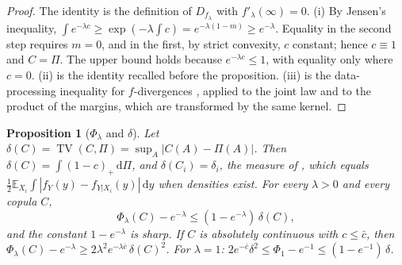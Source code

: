 \documentclass[11pt,a4paper]{article}
\newtheorem{proposition}[theorem]{Proposition}
\theoremstyle{definition}
\theoremstyle{remark}
\newcommand{\E}{\mathbb{E}}
\newcommand{\TV}{\operatorname{TV}}
\begin{document}
\begin{proof}
The identity is the definition of $D_{f_\lambda}$ with $f'_\lambda(\infty)=0$. (i) By Jensen's inequality, $\int e^{-\lambda c}\ge\exp(-\lambda\int c)=e^{-\lambda(1-m)}\ge e^{-\lambda}$. Equality in the second step requires $m=0$, and in the first, by strict convexity, $c$ constant; hence $c\equiv1$ and $C=\Pi$. The upper bound holds because $e^{-\lambda c}\le1$, with equality only where $c=0$. (ii) is the identity recalled before the proposition. (iii) is the data-processing inequality for $f$-divergences \citep{csiszar1967,liese2006}, applied to the joint law and to the product of the margins, which are transformed by the same kernel.
\end{proof}

\begin{proposition}[$\Phi_\lambda$ and $\delta$]\label{prop:phidelta}
Let $\delta(C)=\TV(C,\Pi)=\sup_A|C(A)-\Pi(A)|$. Then $\delta(C)=\int(1-c)_+\,\mathrm{d}\Pi$, and $\delta(C_i)=\delta_i$, the measure of \citet{borgonovo2007}, which equals $\frac12\E_{X_i}\int|f_Y(y)-f_{Y|X_i}(y)|\,\mathrm{d}y$ when densities exist. For every $\lambda>0$ and every copula $C$,
\[
\Phi_\lambda(C)-e^{-\lambda}\le(1-e^{-\lambda})\,\delta(C),
\]
and the constant $1-e^{-\lambda}$ is sharp. If $C$ is absolutely continuous with $c\le\bar c$, then $\Phi_\lambda(C)-e^{-\lambda}\ge2\lambda^2e^{-\lambda\bar c}\,\delta(C)^2$. For $\lambda=1$: $2e^{-\bar c}\delta^2\le\Phi_1-e^{-1}\le(1-e^{-1})\,\delta$.
\end{proposition}
\end{document}
